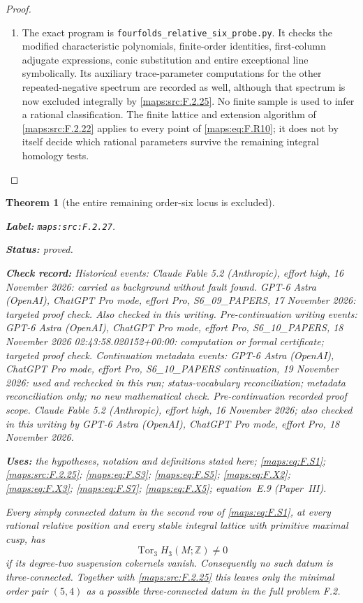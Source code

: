 \documentclass[11pt,a4paper]{article}
\newtheorem{theorem}{Theorem}[section]
\theoremstyle{definition}
\newcommand{\StatementRecord}[4]{\par\smallskip\begingroup\upshape\raggedright\noindent\textbf{Label:} \nolinkurl{#1}.\par\noindent\textbf{Status:} #2.\par\noindent\textbf{Check record:} #3.\par\noindent\textbf{Uses:} #4.\par\endgroup\smallskip}
\newcommand{\ExternalPaperRef}[3]{\ifmmode\text{\upshape #1#2 (Paper~#3)}\else #1#2 (Paper~#3)\fi}
\begin{document}
\begin{proof}
\begin{enumerate}[label=\arabic*.]
\item The exact program is
\texttt{fourfolds\_relative\_six\_probe.py}.
It checks the modified characteristic polynomials, finite-order
identities, first-column adjugate expressions, conic
substitution and entire exceptional line symbolically.
Its auxiliary trace-parameter computations for the other
repeated-negative spectrum are recorded as well, although
that spectrum is now excluded integrally by \ref{maps:src:F.2.25}.
No finite sample is used to infer a rational classification.
The finite lattice and extension algorithm of \ref{maps:src:F.2.22} applies
to every point of \eqref{maps:eq:F.R10}; it does not by itself decide
which rational parameters survive the remaining integral
homology tests.

\end{enumerate}
\end{proof}




\begin{theorem}[the entire remaining order-six locus is excluded]\label{maps:src:F.2.27}
\StatementRecord{maps:src:F.2.27}{proved}{Historical events: Claude Fable 5.2 (Anthropic), effort high, 16 November 2026: carried as background without fault found. GPT-6 Astra (OpenAI), ChatGPT Pro mode, effort Pro, S6\_09\_PAPERS, 17 November 2026: targeted proof check. Also checked in this writing. Pre-continuation writing events: GPT-6 Astra (OpenAI), ChatGPT Pro mode, effort Pro, S6\_10\_PAPERS, 18 November 2026 02:43:58.020152+00:00: computation or formal certificate; targeted proof check. Continuation metadata events: GPT-6 Astra (OpenAI), ChatGPT Pro mode, effort Pro, S6\_10\_PAPERS continuation, 19 November 2026: used and rechecked in this run; status-vocabulary reconciliation; metadata reconciliation only; no new mathematical check. \emph{Pre-continuation recorded proof scope.} Claude Fable 5.2 (Anthropic), effort high, 16 November 2026; also checked in this writing by GPT-6 Astra (OpenAI), ChatGPT Pro mode, effort Pro, 18 November 2026}{the hypotheses, notation and definitions stated here; \cref{maps:eq:F.S1}; \cref{maps:src:F.2.25}; \cref{maps:eq:F.S3}; \cref{maps:eq:F.S5}; \cref{maps:eq:F.X2}; \cref{maps:eq:F.X3}; \cref{maps:eq:F.S7}; \cref{maps:eq:F.X5}; \ExternalPaperRef{equation~}{{E.9}}{III}}


Every simply connected datum in the second row of \eqref{maps:eq:F.S1},
at every rational relative position and every stable integral
lattice with primitive maximal cusp, has
\[
                 \operatorname{Tor}_3 H_3(M;\mathbb Z)\ne0
\]
if its degree-two suspension cokernels vanish.
Consequently no such datum is three-connected.  Together with
\ref{maps:src:F.2.25} this leaves only the minimal order pair $(5,4)$ as a
possible three-connected datum in the full problem F.2.
\end{theorem}
\end{document}
